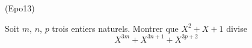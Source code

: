 \begin{tiny}(Epo13)\end{tiny} Soit $m$, $n$, $p$ trois entiers naturels. Montrer que $X^2+X+1$ divise
\begin{displaymath}
 X^{3m} + X^{3n+1} + X^{3p+2}
\end{displaymath}
 